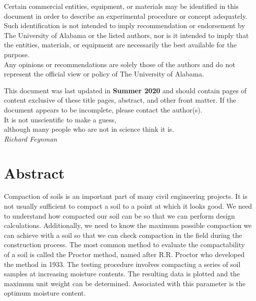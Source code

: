 \documentclass[12pt]{article}
\newcommand{\LastUpdate}{Summer 2020}
\begin{document}
\begin{titlepage}
\begin{center}
\normalsize 
Certain commercial entities, equipment, or materials may be identified in this document in order to describe an experimental procedure or concept adequately. Such identification is not intended to imply recommendation or endorsement by The University of Alabama or the listed authors, nor is it intended to imply that the entities, materials, or equipment are necessarily the best available for the purpose.\\

\vfill
Any opinions or recommendations are solely those of the authors and do not represent the official view or policy of The University of Alabama.
\end{center}
\begin{flushright}
\vfill
\normalsize 
This document was last updated in \textbf{\LastUpdate} and should contain \textbf{\pageref{LastPage}} pages of content exclusive of these title pages, abstract, and other front matter. If the document appears to be incomplete, please contact the author(s).\\
\vfill
It is not unscientific to make a guess,\\although many people who are not in science think it is.\\
\textit{Richard Feynman}
\end{flushright}
\end{titlepage}
\section*{Abstract}
\normalsize Compaction of soils is an important part of many civil engineering projects. It is not usually sufficient to compact a soil to a point at which it looks good. We need to understand how compacted our soil can be so that we can perform design calculations. Additionally, we need to know the maximum possible compaction we can achieve with a soil so that we can check compaction in the field during the construction process. The most common method to evaluate the compactability of a soil is called the Proctor method, named after R.R. Proctor who developed the method in 1933. The testing procedure involves compacting a series of soil samples at increasing moisture contents. The resulting data is plotted and the maximum unit weight can be determined. Associated with this parameter is the optimum moisture content.\\
\end{document}
